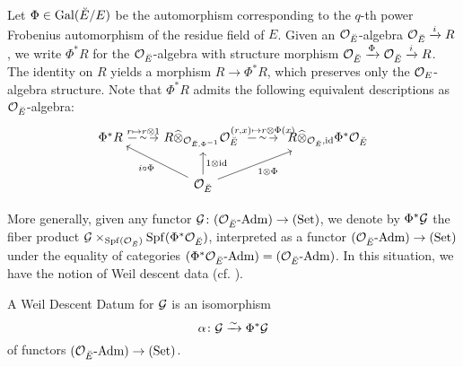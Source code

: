\documentclass[../main.tex]{subfiles}
\begin{document}
Let $\Phi \in \operatorname{Gal}({\breve {E}} / E)$ be the automorphism corresponding to the
$q$-th power Frobenius automorphism of the residue field of $E$. Given
an $\mathcal{O}_{\breve {E}}$-algebra $\mathcal{O}_{\breve {E}} \xrightarrow{i} R$, we write $\Phi^*R$ for the 
$\mathcal{O}_{\breve {E}}$-algebra with structure morphism $\mathcal{O}_{\breve {E}} \xrightarrow{\Phi} \mathcal{O}_{\breve {E}} \xrightarrow{i} R$.
The identity on $R$ yields a morphism $R \to \Phi^* R$, which preserves only the 
$\mathcal{O}_E$-algebra structure. Note that $\Phi^* R$ admits the following equivalent
descriptions as $\mathcal{O}_{\breve {E}}$-algebra:
\begin{equation}\label{eq:PhiRDescription}
\begin{tikzcd}[ampersand replacement=\&]
	{\Phi^*R} \& {R \cotimes_{\cO_{\br E, \Phi^{-1}}}\cO_{\br E} \ } \& {\ R \cotimes_{\cO_{\br E}, \id} \Phi^*\cO_{\br E}} \\
	\& {\cO_{\br E}}
	\arrow["{r \mapsto r \otimes 1}", draw=none, from=1-1, to=1-2]
	\arrow["\sim"{description}, from=1-1, to=1-2]
	\arrow["{(r,x) \mapsto r \otimes\Phi(x)}", draw=none, from=1-2, to=1-3]
	\arrow["\sim"{description}, from=1-2, to=1-3]
	\arrow["{i \circ \Phi}", from=2-2, to=1-1]
	\arrow["{1 \otimes \id}"', from=2-2, to=1-2]
	\arrow["{1 \otimes \Phi}"', from=2-2, to=1-3]
\end{tikzcd}
\end{equation}

More generally, given any functor $\mathcal{G} \colon {({\mathcal{O}_{\breve {E}}}\text-\allowbreak\mathrm{Adm})} \to {(\mathrm{Set})}$, we denote by
$\Phi^* \mathcal{G}$ the fiber product $\mathcal{G} \times_{\operatorname{Spf}(\mathcal{O}_{\breve {E}})} \operatorname{Spf}(\Phi^*
\mathcal{O}_{\breve {E}})$, interpreted as a functor ${({\mathcal{O}_{\breve {E}}}\text-\allowbreak\mathrm{Adm})} \to {(\mathrm{Set})}$ under the
equality of categories ${({\Phi^*\mathcal{O}_{\breve {E}}}\text-\allowbreak\mathrm{Adm})} = {({\mathcal{O}_{\breve {E}}}\text-\allowbreak\mathrm{Adm})}$. In
this situation, we have the notion of Weil descent data
(cf. \cite[Definition 3.45]{rapoport1996period}).

\begin{defi}\label{def:WeilDescentDatum}
  A Weil Descent Datum for $\mathcal{G}$ is an isomorphism
  \begin{equation*}
    \alpha \colon \mathcal{G} \xrightarrow{\sim} \Phi^* \mathcal{G}
  \end{equation*}
  of functors ${({\mathcal{O}_{\breve {E}}}\text-\allowbreak\mathrm{Adm})} \to {(\mathrm{Set})}$.
\end{defi}
\end{document}
